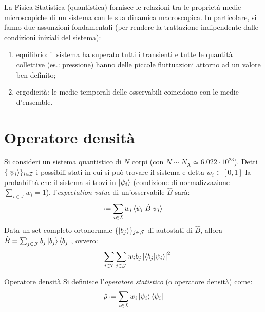 
La Fisica Statistica (quantistica) fornisce le relazioni tra le proprietà medie microscopiche di un sistema con le sua dinamica macroscopica. In particolare, si fanno due assunzioni fondamentali (per rendere la trattazione indipendente dalle condizioni iniziali del sistema):
\begin{enumerate}
	\item equilibrio: il sistema ha superato tutti i transienti e tutte le quantità collettive (es.: pressione) hanno delle piccole fluttuazioni attorno ad un valore ben definito;
	\item ergodicità: le medie temporali delle osservabili coincidono con le medie d'ensemble.
\end{enumerate}

\section{Operatore densità}

Si consideri un sistema quantistico di $ N $ corpi (con $ N \sim N_\text{A} \simeq 6.022 \cdot 10^{23} $). Detti $ \{\ket{\psi_i}\}_{i \in \mathcal{I}} $ i possibili stati in cui si può trovare il sistema e detta $ w_i \in [0,1] $ la probabilità che il sistema si trovi in $ \ket{\psi_i} $ (condizione di normalizzazione $ \sum_{i \in \mathcal{I}} w_i = 1 $), l'\textit{expectation value} di un'osservabile $ \hat{B} $ sarà:
\begin{equation}
	[B] \defeq \sum_{i \in \mathcal{I}} w_i \braket{\psi_i | \hat{B} | \psi_i}
\end{equation}
Data un set completo ortonormale $ \{\ket{b_j}\}_{j \in \mathcal{J}} $ di autostati di $ \hat{B} $, allora $ \hat{B} = \sum_{j \in \mathcal{J}} b_j \ket{b_j}\bra{b_j} $, ovvero:
\begin{equation}
	[B] = \sum_{i \in \mathcal{I}} \sum_{j \in \mathcal{J}} w_i b_j \abs{\braket{b_j | \psi_i}}^2
	\label{eq:b-exp-val}
\end{equation}

\begin{definition}{Operatore densità}{}
	Si definisce l'\textit{operatore statistico} (o operatore densità) come:
	\begin{equation}
		\hat{\rho} \defeq \sum_{i \in \mathcal{I}} w_i \ket{\psi_i}\bra{\psi_i}
	\end{equation}
\end{definition}

